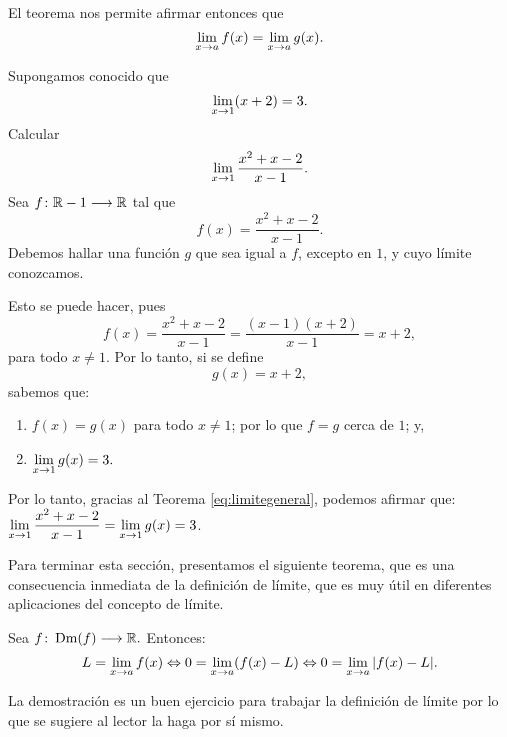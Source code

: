 El teorema nos permite afirmar entonces que
\[
      \limjc{f(x)}{x}{a} = \limjc{g(x)}{x}{a}.
\]


\begin{exemplo}[Solución]{%
Supongamos conocido que
\[
   \limjc{(x + 2)}{x}{1} = 3.
\]
Calcular
\[
   \limjc{\frac{x^2 + x - 2}{x - 1}}{x}{1} .
\]
}%
Sea $\funcjc{f}{\mathbb{R} - {1}}{\mathbb{R}}$ tal que
\[
f(x) = \frac{x^2 + x - 2}{x - 1}.
\]
Debemos hallar una función $g$ que sea igual a $f$, excepto en $1$, y cuyo límite conozcamos.

Esto se puede hacer, pues
\[
   f(x) = \frac{x^2 + x - 2}{x - 1} = \frac{(x - 1)(x + 2)}{x - 1} = x + 2,
\]
para todo $x \neq 1$. Por lo tanto, si se define
\[
   g(x) = x + 2,
\]
sabemos que:
\begin{enumerate}
\item $f(x) = g(x)$ para todo $x \neq 1$; por lo que $f=g$ cerca de $1$; y,
\item $\displaystyle\limjc{g(x)}{x}{1} = 3.$
\end{enumerate}
Por lo tanto, gracias al Teorema \ref{eq:limitegeneral}, podemos afirmar que:
$\displaystyle
   \limjc{\frac{x^2 + x - 2}{x - 1}}{x}{1} = \limjc{g(x)}{x}{1} = 3$.
\end{exemplo}

Para terminar esta sección, presentamos el siguiente teorema, que es una consecuencia inmediata de
la definición de límite, que es muy útil en diferentes aplicaciones del concepto de límite.

\begin{teocal}\label{teol:LEquiv0} Sea $\funcjc{f}{\Dm(f)}{\mathbb{R}}.$ Entonces:
\[
   L = \limjc{f(x)}{x}{a} \Leftrightarrow 0 = \limjc{(f(x) - L)}{x}{a} \Leftrightarrow
   0 = \limjc{|f(x) - L|}{x}{a}.
\]
\end{teocal}%

La demostración es un buen ejercicio para trabajar la definición de límite por lo que se sugiere al
lector la haga por sí mismo.\newline

